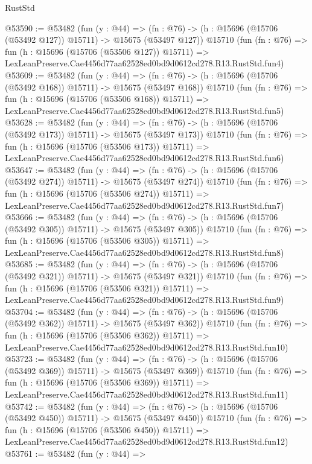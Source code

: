\begin{lexlean}{RustStd}
\begin{coremodule}
@53590 := @53482
    (fun (y : @44) =>
    (fn : @76) -> (h : @15696 (@15706 (@53492 @127)) @15711) -> @15675 (@53497 @127))
    @15710
    (fun (fn : @76) =>
    fun (h : @15696 (@15706 (@53506 @127)) @15711) =>
    LexLeanPreserve.Cae4456d77aa62528ed0bd9d0612cd278.R13.RustStd.fun4)
@53609 := @53482
    (fun (y : @44) =>
    (fn : @76) -> (h : @15696 (@15706 (@53492 @168)) @15711) -> @15675 (@53497 @168))
    @15710
    (fun (fn : @76) =>
    fun (h : @15696 (@15706 (@53506 @168)) @15711) =>
    LexLeanPreserve.Cae4456d77aa62528ed0bd9d0612cd278.R13.RustStd.fun5)
@53628 := @53482
    (fun (y : @44) =>
    (fn : @76) -> (h : @15696 (@15706 (@53492 @173)) @15711) -> @15675 (@53497 @173))
    @15710
    (fun (fn : @76) =>
    fun (h : @15696 (@15706 (@53506 @173)) @15711) =>
    LexLeanPreserve.Cae4456d77aa62528ed0bd9d0612cd278.R13.RustStd.fun6)
@53647 := @53482
    (fun (y : @44) =>
    (fn : @76) -> (h : @15696 (@15706 (@53492 @274)) @15711) -> @15675 (@53497 @274))
    @15710
    (fun (fn : @76) =>
    fun (h : @15696 (@15706 (@53506 @274)) @15711) =>
    LexLeanPreserve.Cae4456d77aa62528ed0bd9d0612cd278.R13.RustStd.fun7)
@53666 := @53482
    (fun (y : @44) =>
    (fn : @76) -> (h : @15696 (@15706 (@53492 @305)) @15711) -> @15675 (@53497 @305))
    @15710
    (fun (fn : @76) =>
    fun (h : @15696 (@15706 (@53506 @305)) @15711) =>
    LexLeanPreserve.Cae4456d77aa62528ed0bd9d0612cd278.R13.RustStd.fun8)
@53685 := @53482
    (fun (y : @44) =>
    (fn : @76) -> (h : @15696 (@15706 (@53492 @321)) @15711) -> @15675 (@53497 @321))
    @15710
    (fun (fn : @76) =>
    fun (h : @15696 (@15706 (@53506 @321)) @15711) =>
    LexLeanPreserve.Cae4456d77aa62528ed0bd9d0612cd278.R13.RustStd.fun9)
@53704 := @53482
    (fun (y : @44) =>
    (fn : @76) -> (h : @15696 (@15706 (@53492 @362)) @15711) -> @15675 (@53497 @362))
    @15710
    (fun (fn : @76) =>
    fun (h : @15696 (@15706 (@53506 @362)) @15711) =>
    LexLeanPreserve.Cae4456d77aa62528ed0bd9d0612cd278.R13.RustStd.fun10)
@53723 := @53482
    (fun (y : @44) =>
    (fn : @76) -> (h : @15696 (@15706 (@53492 @369)) @15711) -> @15675 (@53497 @369))
    @15710
    (fun (fn : @76) =>
    fun (h : @15696 (@15706 (@53506 @369)) @15711) =>
    LexLeanPreserve.Cae4456d77aa62528ed0bd9d0612cd278.R13.RustStd.fun11)
@53742 := @53482
    (fun (y : @44) =>
    (fn : @76) -> (h : @15696 (@15706 (@53492 @450)) @15711) -> @15675 (@53497 @450))
    @15710
    (fun (fn : @76) =>
    fun (h : @15696 (@15706 (@53506 @450)) @15711) =>
    LexLeanPreserve.Cae4456d77aa62528ed0bd9d0612cd278.R13.RustStd.fun12)
@53761 := @53482
    (fun (y : @44) =>

\end{coremodule}
\end{lexlean}
